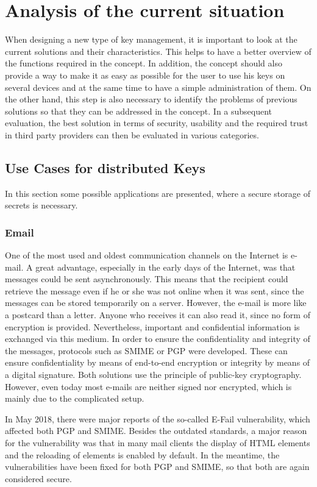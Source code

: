 \documentclass[12pt,oneside,a4paper,parskip]{scrbook}
\begin{document}
\chapter{Analysis of the current situation}

When designing a new type of key management, it is important to look at the current solutions and their characteristics. This helps to have a better overview of the functions required in the concept. In addition, the concept should also provide a way to make it as easy as possible for the user to use his keys on several devices and at the same time to have a simple administration of them. On the other hand, this step is also necessary to identify the problems of previous solutions so that they can be addressed in the concept. In a subsequent evaluation, the best solution in terms of security, usability and the required trust in third party providers can then be evaluated in various categories.

\section{Use Cases for distributed Keys}
In this section some possible applications are presented, where a secure storage of secrets is necessary. 

\subsection{Email}

One of the most used and oldest communication channels on the Internet is e-mail. A great advantage, especially in the early days of the Internet, was that messages could be sent asynchronously. This means that the recipient could retrieve the message even if he or she was not online when it was sent, since the messages can be stored temporarily on a server. However, the e-mail is more like a postcard than a letter. Anyone who receives it can also read it, since no form of encryption is provided. Nevertheless, important and confidential information is exchanged via this medium. In order to ensure the confidentiality and integrity of the messages, protocols such as SMIME or PGP were developed. These can ensure confidentiality by means of end-to-end encryption or integrity by means of a digital signature. Both solutions use the principle of public-key cryptography. However, even today most e-mails are neither signed nor encrypted, which is mainly due to the complicated setup. 

In May 2018, there were major reports of the so-called E-Fail vulnerability, which affected both PGP and SMIME. Besides the outdated standards, a major reason for the vulnerability was that in many mail clients the display of HTML elements and the reloading of elements is enabled by default. In the meantime, the vulnerabilities have been fixed for both PGP and SMIME, so that both are again considered secure.
\end{document}
